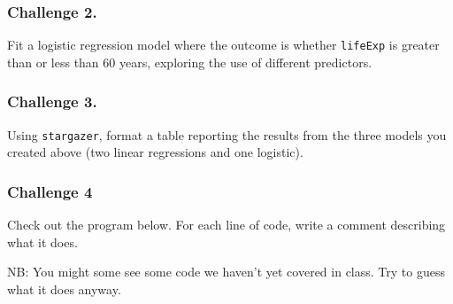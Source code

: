 \documentclass[
]{book}
\begin{document}
\hypertarget{challenge-2.-7}{%
\subsubsection*{Challenge 2.}\label{challenge-2.-7}}

Fit a logistic regression model where the outcome is whether \texttt{lifeExp} is greater than or less than 60 years, exploring the use of different predictors.

\hypertarget{challenge-3.-5}{%
\subsubsection*{Challenge 3.}\label{challenge-3.-5}}

Using \texttt{stargazer}, format a table reporting the results from the three models you created above (two linear regressions and one logistic).

\hypertarget{challenge-4}{%
\subsubsection*{Challenge 4}\label{challenge-4}}

Check out the program below. For each line of code, write a comment describing what it does.

NB: You might some see some code we haven't yet covered in class. Try to guess what it does anyway.
\end{document}
